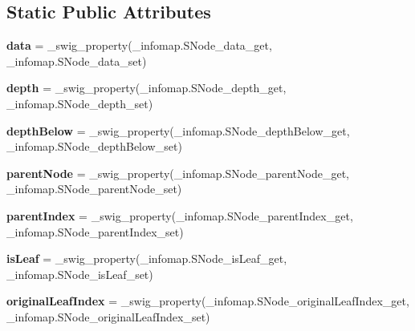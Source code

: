 \subsection*{Static Public Attributes}
\begin{DoxyCompactItemize}
\item 
\mbox{\label{classinfomap_1_1SNode_a1de4c5d16b1b49e44a74920d9be203f7}} 
{\bfseries data} = \+\_\+swig\+\_\+property(\+\_\+infomap.\+S\+Node\+\_\+data\+\_\+get, \+\_\+infomap.\+S\+Node\+\_\+data\+\_\+set)
\item 
\mbox{\label{classinfomap_1_1SNode_afc211c97365451b4cf2179dafcb51eb2}} 
{\bfseries depth} = \+\_\+swig\+\_\+property(\+\_\+infomap.\+S\+Node\+\_\+depth\+\_\+get, \+\_\+infomap.\+S\+Node\+\_\+depth\+\_\+set)
\item 
\mbox{\label{classinfomap_1_1SNode_aaf03bb3fd25fc30268d93906b40316ba}} 
{\bfseries depth\+Below} = \+\_\+swig\+\_\+property(\+\_\+infomap.\+S\+Node\+\_\+depth\+Below\+\_\+get, \+\_\+infomap.\+S\+Node\+\_\+depth\+Below\+\_\+set)
\item 
\mbox{\label{classinfomap_1_1SNode_ac8c549ffa2dd1f11d4b41f87741090b7}} 
{\bfseries parent\+Node} = \+\_\+swig\+\_\+property(\+\_\+infomap.\+S\+Node\+\_\+parent\+Node\+\_\+get, \+\_\+infomap.\+S\+Node\+\_\+parent\+Node\+\_\+set)
\item 
\mbox{\label{classinfomap_1_1SNode_aeb1e60151e36cebf5146dee0bed75213}} 
{\bfseries parent\+Index} = \+\_\+swig\+\_\+property(\+\_\+infomap.\+S\+Node\+\_\+parent\+Index\+\_\+get, \+\_\+infomap.\+S\+Node\+\_\+parent\+Index\+\_\+set)
\item 
\mbox{\label{classinfomap_1_1SNode_a38852c9e4ed987b2ce55277c92f05891}} 
{\bfseries is\+Leaf} = \+\_\+swig\+\_\+property(\+\_\+infomap.\+S\+Node\+\_\+is\+Leaf\+\_\+get, \+\_\+infomap.\+S\+Node\+\_\+is\+Leaf\+\_\+set)
\item 
\mbox{\label{classinfomap_1_1SNode_af5e9715b0856a60ff1122467424551fa}} 
{\bfseries original\+Leaf\+Index} = \+\_\+swig\+\_\+property(\+\_\+infomap.\+S\+Node\+\_\+original\+Leaf\+Index\+\_\+get, \+\_\+infomap.\+S\+Node\+\_\+original\+Leaf\+Index\+\_\+set)

\end{DoxyCompactItemize}
